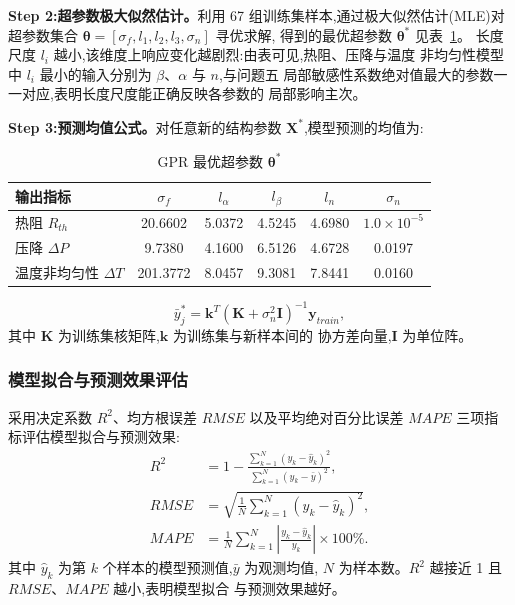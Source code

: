 \textbf{Step 2:超参数极大似然估计。}利用 67 组训练集样本,通过极大似然估计(MLE)对超参数集合
$\boldsymbol{\theta} = [\sigma_f, l_1, l_2, l_3, \sigma_n]$ 寻优求解,
得到的最优超参数 $\boldsymbol{\theta}^*$ 见表~\ref{tab:gpr-hyper}。
长度尺度 $l_i$ 越小,该维度上响应变化越剧烈:由表可见,热阻、压降与温度
非均匀性模型中 $l_i$ 最小的输入分别为 $\beta$、$\alpha$ 与 $n$,与问题五
局部敏感性系数绝对值最大的参数一一对应,表明长度尺度能正确反映各参数的
局部影响主次。

\textbf{Step 3:预测均值公式。}对任意新的结构参数 $\mathbf{X}^*$,模型预测的均值为:

\begin{table}[htbp]
  \centering
  \caption{GPR 最优超参数 $\boldsymbol{\theta}^*$}
  \label{tab:gpr-hyper}
  \begin{tabular}{lccccc}
    \toprule
    输出指标              & $\sigma_f$ & $l_\alpha$ & $l_\beta$ & $l_n$  & $\sigma_n$         \\
    \midrule
    热阻 $R_{th}$       & 20.6602    & 5.0372     & 4.5245    & 4.6980 & $1.0\times10^{-5}$ \\
    压降 $\Delta P$     & 9.7380     & 4.1600     & 6.5126    & 4.6728 & 0.0197             \\
    温度非均匀性 $\Delta T$ & 201.3772   & 8.0457     & 9.3081    & 7.8441 & 0.0160             \\
    \bottomrule
  \end{tabular}
\end{table}
\begin{equation}
  \bar{y}^*_j = \mathbf{k}^T (\mathbf{K} + \sigma_n^2 \mathbf{I})^{-1}
  \mathbf{y}_{train},
  \label{eq:gpr-predict}
\end{equation}
其中 $\mathbf{K}$ 为训练集核矩阵,$\mathbf{k}$ 为训练集与新样本间的
协方差向量,$\mathbf{I}$ 为单位阵。

\subsubsection{模型拟合与预测效果评估}

采用决定系数 $R^2$、均方根误差 $RMSE$ 以及平均绝对百分比误差 $MAPE$
三项指标评估模型拟合与预测效果:
\begin{align}
  R^2  & = 1 - \frac{\sum_{k=1}^{N} (y_k - \hat{y}_k)^2}
  {\sum_{k=1}^{N} (y_k - \bar{y})^2},
  \label{eq:r2}                                                   \\
  RMSE & = \sqrt{\frac{1}{N} \sum_{k=1}^{N} (y_k - \hat{y}_k)^2},
  \label{eq:rmse}                                                 \\
  MAPE & = \frac{1}{N} \sum_{k=1}^{N} \left\vert
  \frac{y_k - \hat{y}_k}{y_k} \right\vert \times 100\%.
  \label{eq:mape}
\end{align}
其中 $\hat{y}_k$ 为第 $k$ 个样本的模型预测值,$\bar{y}$ 为观测均值,
$N$ 为样本数。$R^2$ 越接近 1 且 $RMSE$、$MAPE$ 越小,表明模型拟合
与预测效果越好。

